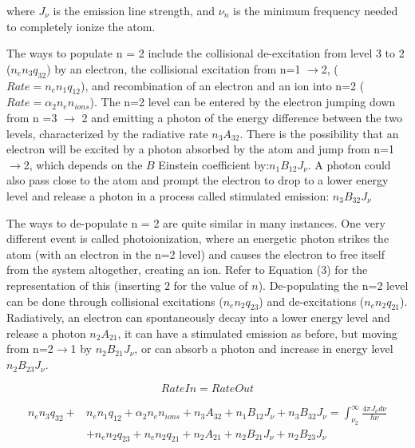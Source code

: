 \documentclass{article}
\begin{document}
where $J_{\nu}$ is the emission line strength, and $\nu_n$ is the minimum frequency needed to completely ionize the atom.

The ways to populate n = 2 include the collisional de-excitation from level 3 to 2 ($n_e n_{3} q_{32}$) by an electron, the collisional excitation from  n=1 $\rightarrow$2, ($Rate = n_e n_{1} q_{12}$), and recombination of an electron and an ion into n=2 ($Rate = \alpha_2 n_e n_{ions} $). The n=2 level can be entered by the electron jumping down from n =3 $\rightarrow$ 2 and emitting a photon of the energy difference between the two levels, characterized by the radiative rate $n_3 A_{32}$. There is the possibility that an electron will be excited by a photon absorbed by the atom and jump from n=1$\rightarrow$2, which depends on the $B$ Einstein coefficient by:$n_1 B_12 J_{\nu}$. A photon could also pass close to the atom and prompt the electron to drop to a lower energy level and release a photon in a process called stimulated emission: $n_3 B_32 J_{\nu}$

The ways to de-populate n = 2 are quite similar in many instances. One very different event is called photoionization, where an energetic photon strikes the atom (with an electron in the n=2 level) and causes the electron to free itself from the system altogether, creating an ion. Refer to Equation (3) for the representation of this (inserting $2$ for the value of $n$). De-populating the n=2 level can be done through collisional excitations ($n_e n_{2} q_{23}$) and de-excitations ($n_e n_{2} q_{21}$). Radiatively, an electron can spontaneously decay into a lower energy level and release a photon $n_2 A_{21}$, it can have a stimulated emission as before, but moving from n=2$\rightarrow$1 by $n_2 B_21 J_{\nu}$, or can absorb a photon and increase in energy level $n_2 B_23 J_{\nu}$.

\begin{equation}
Rate In = Rate Out
\end{equation}

\begin{equation}
\begin{split}
n_e n_{3} q_{32} + & n_e n_{1} q_{12} + \alpha_2 n_e n_{ions} + n_3 A_{32} + n_1 B_12 J_{\nu} + n_3 B_32 J_{\nu} =  \int_{\nu_2}^\infty \frac{4 \pi J_{\nu} d\nu}{h \nu} \\
& + n_e n_{2} q_{23} + n_e n_{2} q_{21} + n_2 A_{21} + n_2 B_21 J_{\nu} + n_2 B_23 J_{\nu}
\end{split}
\end{equation}
\end{document}
